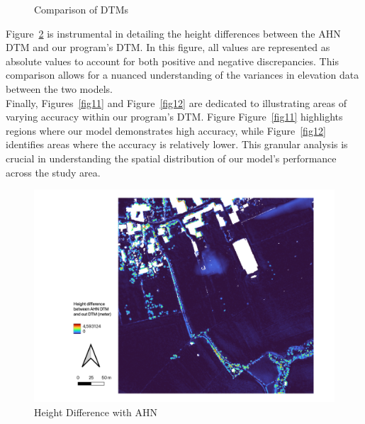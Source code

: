 \documentclass{article}
\begin{document}
\begin{figure}[H]
    \centering
    \hspace{0.5cm}
    \caption{Comparison of DTMs}
    \label{fig:comparison}
\end{figure}

\noindent Figure~\ref{fig10} is instrumental in detailing the height differences between the AHN DTM and our program's DTM. In this figure, all values are represented as absolute values to account for both positive and negative discrepancies. This comparison allows for a nuanced understanding of the variances in elevation data between the two models.\\

\noindent Finally, Figures~\ref{fig11} and Figure~\ref{fig12} are dedicated to illustrating areas of varying accuracy within our program's DTM. Figure Figure~\ref{fig11} highlights regions where our model demonstrates high accuracy, while Figure~\ref{fig12} identifies areas where the accuracy is relatively lower. This granular analysis is crucial in understanding the spatial distribution of our model's performance across the study area.\\

\begin{figure}[H]
    \centering
    \includegraphics[width=0.7\linewidth]{Figures/fig10.png}
    \caption{Height Difference with AHN}
    \label{fig10}
\end{figure}
\end{document}
